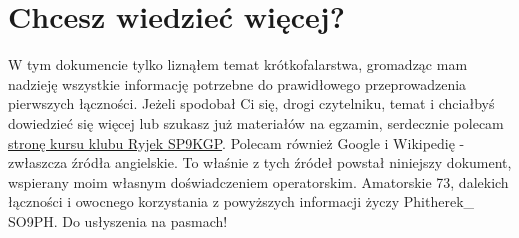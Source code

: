 \documentclass[a4paper,11pt]{article}
\begin{document}
\section{Chcesz wiedzieć więcej?}
W tym dokumencie tylko liznąłem temat krótkofalarstwa, gromadząc mam nadzieję wszystkie informację potrzebne do prawidłowego przeprowadzenia pierwszych łączności. Jeżeli spodobał Ci się, drogi czytelniku, temat i chciałbyś dowiedzieć się więcej lub szukasz już materiałów na egzamin, serdecznie polecam \href{http://kurs.sp9kgp.org}{stronę kursu klubu Ryjek SP9KGP}. Polecam również Google i Wikipedię - zwłaszcza źródła angielskie. To właśnie z tych źródeł powstał niniejszy dokument, wspierany moim własnym doświadczeniem operatorskim. Amatorskie 73, dalekich łączności i owocnego korzystania z powyższych informacji życzy Phitherek\_ SO9PH. Do usłyszenia na pasmach!
\end{document}

